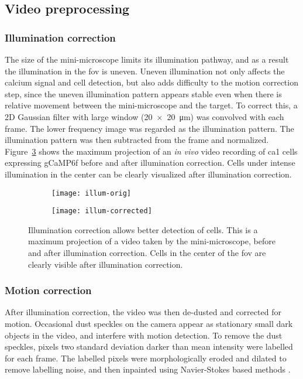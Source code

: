 \subsection{Video preprocessing}
\subsubsection{Illumination correction}
The size of the mini-microscope limits its illumination pathway, and as a result the illumination in the \gls{fov} is uneven. Uneven illumination not only affects the calcium signal and cell detection, but also adds difficulty to the motion correction step, since the uneven illumination pattern appears stable even when there is relative movement between the mini-microscope and the target. To correct this, a 2D Gaussian filter with large window (\SI{20x20}{\um}) was convolved with each frame. The lower frequency image was regarded as the illumination pattern. The illumination pattern was then subtracted from the frame and normalized. Figure~\ref{f.illumination} shows the maximum projection of an \textit{in vivo} video recording of \gls{ca1} cells expressing gCaMP6f before and after illumination correction. Cells under intense illumination in the center can be clearly visualized after illumination correction.

\begin{figure}[h]
    \begin{subfigure}[t]{.5\textwidth}
        \centering
        \texttt{[image: illum-orig]}
        \caption{\label{illum.orig}}
    \end{subfigure}
    \begin{subfigure}[t]{.5\textwidth}
        \centering
        \texttt{[image: illum-corrected]}
        \caption{\label{illum.corrected}}
    \end{subfigure}
    \caption[Illumination correction.]{Illumination correction allows better detection of cells. This is a maximum projection of a video taken by the mini-microscope, before  and after  illumination correction. Cells in the center of the \gls{fov} are clearly visible after illumination correction. \label{f.illumination}}
\end{figure}

\subsubsection{Motion correction}
After illumination correction, the video was then de-dusted and corrected for motion. Occasional dust speckles on the camera appear as stationary small dark objects in the video, and interfere with motion detection. To remove the dust speckles, pixels two standard deviation darker than mean intensity were labelled for each frame. The labelled pixels were morphologically eroded and dilated to remove labelling noise, and then inpainted using Navier-Stokes based methods \citep{bertalmio01}.

